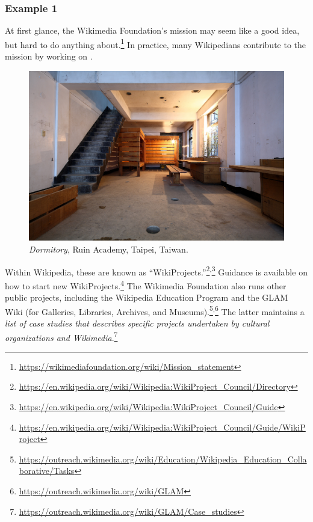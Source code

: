 \subsubsection*{Example 1}
At first glance, the Wikimedia Foundation's mission may seem like a good idea, but hard to do anything about.\footnote{\url{https://wikimediafoundation.org/wiki/Mission_statement}} 
In practice, many Wikipedians contribute to the mission
by working on .
\begin{figure}
\vspace{-.6cm}
\begin{center}
\includegraphics[width=.37\textwidth,trim=0 85 0 20, clip=true]{Ruin_Academy_Dorm}
\end{center}
\vspace{-.5cm}
\captionsetup{font=footnotesize,width=.45\textwidth}
\caption{\textsl{Dormitory}, Ruin Academy, Taipei, Taiwan. 
\label{dormitory}
}
\vspace{-.9cm}
\end{figure}
Within Wikipedia, these are known as ``WikiProjects.''\footnote{\url{https://en.wikipedia.org/wiki/Wikipedia:WikiProject_Council/Directory}}\textsuperscript{,}\footnote{\url{https://en.wikipedia.org/wiki/Wikipedia:WikiProject_Council/Guide}}
Guidance is available on how to start new WikiProjects.\footnote{\url{https://en.wikipedia.org/wiki/Wikipedia:WikiProject_Council/Guide/WikiProject}}
The Wikimedia Foundation also runs other public projects, including the Wikipedia Education Program and the GLAM Wiki (for Galleries, Libraries, Archives, and Museums).\footnote{\url{https://outreach.wikimedia.org/wiki/Education/Wikipedia_Education_Collaborative/Tasks}}\textsuperscript{,}\footnote{\url{https://outreach.wikimedia.org/wiki/GLAM}}  The latter maintains a \emph{list of case studies that describes specific projects undertaken by cultural organizations and Wikimedia}.\footnote{\url{https://outreach.wikimedia.org/wiki/GLAM/Case_studies}}


